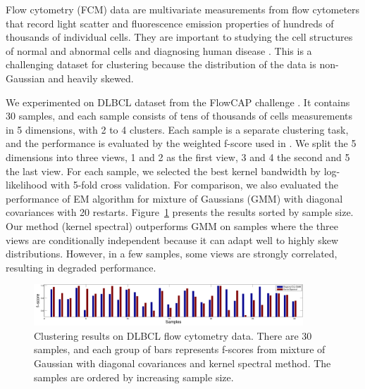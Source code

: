 
Flow cytometry (FCM) data are multivariate measurements from flow cytometers that record light scatter and fluorescence emission properties of hundreds of thousands of individual cells. They are important to studying the cell structures of normal and abnormal cells and diagnosing human disease \cite{cytometry_nature}. This is a challenging dataset for clustering because the distribution of the data is non-Gaussian and heavily skewed.

We experimented on DLBCL dataset from the FlowCAP challenge \cite{cytometry_nature}. It contains 30 samples, and each sample consists of tens of thousands of cells measurements in 5 dimensions, with 2 to 4 clusters. Each sample is a separate clustering task, and the performance is evaluated by the weighted f-score used in \cite{cytometry_nature}. We split the 5 dimensions into three views, 1 and 2 as the first view, 3 and 4 the second and 5 the last view. For each sample, we selected the best kernel bandwidth by log-likelihood with 5-fold cross validation. For comparison, we also evaluated the performance of EM algorithm for mixture of Gaussians (GMM) with diagonal covariances with 20 restarts. Figure~\ref{fig:real_data} presents the results sorted by sample size. Our method (kernel spectral) outperforms GMM on samples where the three views are conditionally independent because it can adapt well to highly skew distributions. However, in a few samples, some views are strongly correlated, resulting in degraded performance. 


\begin{figure}
  \centering
  \includegraphics[width=0.9\textwidth]{../experiment/figure/paired_bar_chat} 
   \vspace{-3mm}
  \caption{Clustering results on DLBCL flow cytometry data. There are 30 samples, and each group of bars represents f-scores from mixture of Gaussian with diagonal covariances and kernel spectral method. The samples are ordered by increasing sample size.}\label{fig:real_data}
  \vspace{-3mm}
\end{figure}
